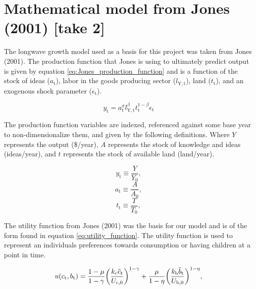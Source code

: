 \documentclass[letterpaper,12pt]{article}
\begin{document}

\section{Mathematical model from Jones (2001) [take 2]}
The longwave growth model used as a basis for this project was taken from Jones (2001). The production function that Jones is using to ultimately predict output is given by equation \ref{eq:Jones_production_function} and is a function of the stock of ideas ($a_\mathrm{t}$), labor in the goods producing sector ($l_\mathrm{Y,t}$), land ($t_\mathrm{t}$), and an exogenous shock parameter ($\epsilon_\mathrm{t}$).

\begin{equation} \label{eq:Jones_production_function}
y_\mathrm{t} = a_\mathrm{t} ^\sigma l_\mathrm{Y,t} ^\beta t_\mathrm{t} ^{1-\beta} \epsilon_\mathrm{t}
\end{equation}

The production function variables are indexed, referenced against some base year to non-dimensionalize them, and given by the following definitions. Where $Y$ represents the output (\$/year), $A$ represents the stock of knowledge and ideas (ideas/year), and $t$ represents the stock of available land (land/year).

\begin{equation} \label{eq:index_y}
y_\mathrm{t} \equiv \frac{Y}{Y_\mathrm{0}},
\end{equation}
\begin{equation} \label{eq:index_a}
a_\mathrm{t} \equiv \frac{A}{A_\mathrm{0}},
\end{equation}
\begin{equation} \label{eq:index_t}
t_\mathrm{t} \equiv \frac{T}{T_\mathrm{0}},
\end{equation}


The utility function from Jones (2001) was the basis for our model and is of the form found in equation \ref{eq:utility_function}. The utility function is used to represent an individuals preferences towards consumption or having children at a point in time. 

\begin{equation} \label{eq:utility_function}
u(c_\mathrm{t}, b_\mathrm{t}) = \frac{1-\mu}{1-\gamma} \bigg{(}\frac{k_\mathrm{c} \tilde c_\mathrm{t}}{U_\mathrm{c,0}} \bigg{)}^{1-\gamma} + \frac{\mu}{1-\eta} \bigg{(}\frac{k_\mathrm{b} \tilde b_\mathrm{t}}{U_\mathrm{b,0}} \bigg{)}^{1-\eta},
\end{equation}
\end{document}
